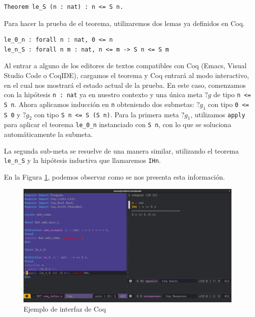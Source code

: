 \begin{lstlisting}[frame=tb,caption={Teorema ejemplo},label=lst:le_S]
Theorem le_S (n : nat) : n <= S n.
\end{lstlisting}

Para hacer la prueba de el teorema, utilizaremos dos lemas ya definidos en Coq.

\begin{lstlisting}[frame=tb,caption={Teoremas \lstinline{le_0_n} y \lstinline{le_n_S}}]
le_0_n : forall n : nat, 0 <= n
le_n_S : forall n m : nat, n <= m -> S n <= S m
\end{lstlisting}

Al entrar a alguno de los editores de textos compatibles con Coq (Emacs, Visual Studio Code o CoqIDE), cargamos el teorema y Coq entrará al modo interactivo, en el cual nos mostrará el estado actual de la prueba.
En este caso, comenzamos con la hipótesis \lstinline{n : nat} ya en nuestro contexto y una única meta $?g$ de tipo \lstinline{n <= S n}.
Ahora aplicamos inducción en \lstinline{n} obteniendo dos submetas: $?g_1$ con tipo \lstinline{0 <= S 0} y $?g_2$ con tipo \lstinline{S n <= S (S n)}.
Para la primera meta $?g_1$, utilizamos \lstinline{apply} para aplicar el teorema \lstinline{le_0_n} instanciado con \lstinline{S n}, con lo que se soluciona automáticamente la submeta.

La segunda sub-meta se resuelve de una manera similar, utilizando el teorema \lstinline{le_n_S} y la hipótesis inductiva que llamaremos \lstinline{IHn}.

En la Figura \ref{fig:ui}, podemos observar como se nos presenta esta información.

\begin{figure}[h]
  \centering
  \includegraphics[width=1\textwidth]{gfx/coq_emacs_example.png}
  \caption{Ejemplo de interfaz de Coq}
  \label{fig:ui}
\end{figure}

